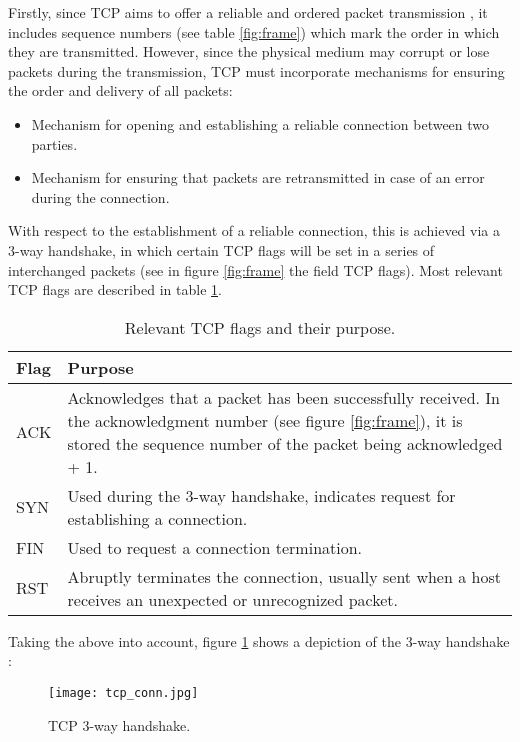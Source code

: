 Firstly, since TCP aims to offer a reliable and ordered packet transmission \cite{tcp_reliable}, it includes sequence numbers (see table \ref{fig:frame}) which mark the order in which they are transmitted. However, since the physical medium may corrupt or lose packets during the transmission, TCP must incorporate mechanisms for ensuring the order and delivery of all packets:
\begin{itemize}
\item Mechanism for opening and establishing a reliable connection between two parties.
\item Mechanism for ensuring that packets are retransmitted in case of an error during the connection.
\end{itemize}

With respect to the establishment of a reliable connection, this is achieved via a 3-way handshake, in which certain TCP flags will be set in a series of interchanged packets (see in figure \ref{fig:frame} the field TCP flags). Most relevant TCP flags are described in table \ref{table:tcp_flags}.

\begin{table}[htbp]
\begin{tabular}{|>{\centering\arraybackslash}p{4cm}|>{\centering\arraybackslash}p{10cm}|}
\hline
Flag & Purpose\\
\hline
\hline
ACK & Acknowledges that a packet has been successfully received. In the acknowledgment number (see figure \ref{fig:frame}), it is stored the sequence number of the packet being acknowledged + 1. \\
\hline
SYN & Used during the 3-way handshake, indicates request for establishing a connection.\\
\hline
FIN & Used to request a connection termination.\\
\hline
RST & Abruptly terminates the connection, usually sent when a host receives an unexpected or unrecognized packet.\\
\hline
\end{tabular}
\caption{Relevant TCP flags and their purpose.}
\label{table:tcp_flags}
\end{table}

Taking the above into account, figure \ref{fig:tcp_conn} shows a depiction of the 3-way handshake \cite{tcp_handshake}:
\begin{figure}[htbp]
	\centering
	\texttt{[image: tcp\_conn.jpg]}
	\caption{TCP 3-way handshake.}
	\label{fig:tcp_conn}
\end{figure}

